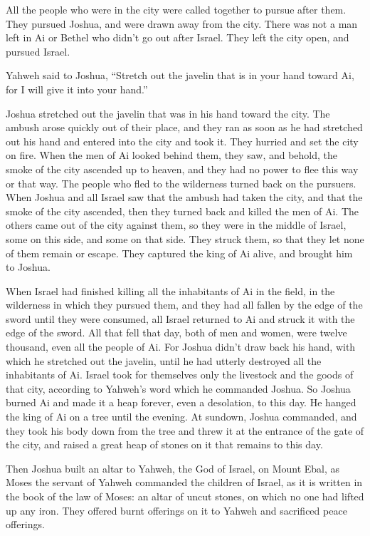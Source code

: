 {All the people who were in the city were called together to pursue after them. They pursued Joshua, and were drawn away from the city.
There was not a man left in Ai or Bethel who didn’t go out after Israel. They left the city open, and pursued Israel.
\par }{\PP {}Yahweh said to Joshua, “Stretch out the javelin that is in your hand toward Ai, for I will give it into your hand.”
\par }{\PP Joshua stretched out the javelin that was in his hand toward the city.
The ambush arose quickly out of their place, and they ran as soon as he had stretched out his hand and entered into the city and took it. They hurried and set the city on fire.
When the men of Ai looked behind them, they saw, and behold, the smoke of the city ascended up to heaven, and they had no power to flee this way or that way. The people who fled to the wilderness turned back on the pursuers.
When Joshua and all Israel saw that the ambush had taken the city, and that the smoke of the city ascended, then they turned back and killed the men of Ai.
The others came out of the city against them, so they were in the middle of Israel, some on this side, and some on that side. They struck them, so that they let none of them remain or escape.
They captured the king of Ai alive, and brought him to Joshua.
\par }{\PP {}When Israel had finished killing all the inhabitants of Ai in the field, in the wilderness in which they pursued them, and they had all fallen by the edge of the sword until they were consumed, all Israel returned to Ai and struck it with the edge of the sword.
All that fell that day, both of men and women, were twelve thousand, even all the people of Ai.
For Joshua didn’t draw back his hand, with which he stretched out the javelin, until he had utterly destroyed all the inhabitants of Ai.
Israel took for themselves only the livestock and the goods of that city, according to Yahweh’s word which he commanded Joshua.
So Joshua burned Ai and made it a heap forever, even a desolation, to this day.
He hanged the king of Ai on a tree until the evening. At sundown, Joshua commanded, and they took his body down from the tree and threw it at the entrance of the gate of the city, and raised a great heap of stones on it that remains to this day.
\par }{\PP {}Then Joshua built an altar to Yahweh, the God of Israel, on Mount Ebal,
as Moses the servant of Yahweh commanded the children of Israel, as it is written in the book of the law of Moses: an altar of uncut stones, on which no one had lifted up any iron. They offered burnt offerings on it to Yahweh and sacrificed peace offerings.
}
